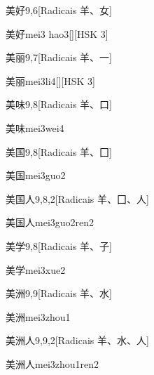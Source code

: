 \begin{entry}{美好}{9,6}[Radicais ⽺、⼥]
  \begin{phonetics}{美好}{mei3 hao3}[][HSK 3]
  \end{phonetics}
\end{entry}

\begin{entry}{美丽}{9,7}[Radicais ⽺、⼀]
  \begin{phonetics}{美丽}{mei3li4}[][HSK 3]
  \end{phonetics}
\end{entry}

\begin{entry}{美味}{9,8}[Radicais ⽺、⼝]
  \begin{phonetics}{美味}{mei3wei4}
  \end{phonetics}
\end{entry}

\begin{entry}{美国}{9,8}[Radicais ⽺、⼞]
  \begin{phonetics}{美国}{mei3guo2}
  \end{phonetics}
\end{entry}

\begin{entry}{美国人}{9,8,2}[Radicais ⽺、⼞、⼈]
  \begin{phonetics}{美国人}{mei3guo2ren2}
  \end{phonetics}
\end{entry}

\begin{entry}{美学}{9,8}[Radicais ⽺、⼦]
  \begin{phonetics}{美学}{mei3xue2}
  \end{phonetics}
\end{entry}

\begin{entry}{美洲}{9,9}[Radicais ⽺、⽔]
  \begin{phonetics}{美洲}{mei3zhou1}
  \end{phonetics}
\end{entry}

\begin{entry}{美洲人}{9,9,2}[Radicais ⽺、⽔、⼈]
  \begin{phonetics}{美洲人}{mei3zhou1ren2}
  \end{phonetics}
\end{entry}

